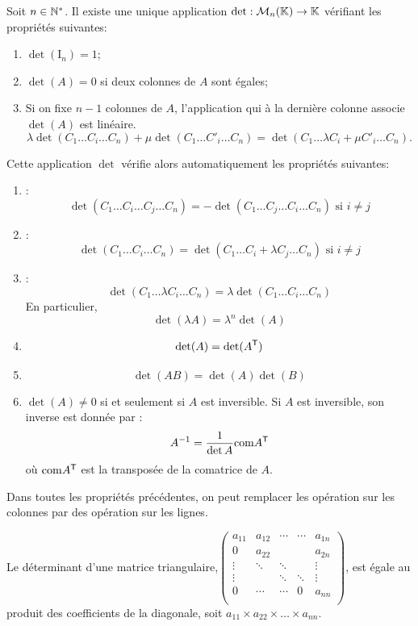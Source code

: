 \documentclass{book}
\begin{document}
\begin{Theoreme}
Soit $n\in  \mathbb{N}^*$.
Il existe une unique application $\mathop{\mathrm{det}}\nolimits: \mathcal{M}_{n}(\mathbb{K})\to\mathbb{K}$ vérifiant les propriétés suivantes:
\begin{enumerate}
\item $\det(\mathrm{I}_n) = 1$;
\item
  $\det(A) = 0$ si deux colonnes de $A$ sont égales;
\item
  Si on fixe $n-1$ colonnes de $A$, l'application qui à la dernière colonne associe $\det(A)$ est linéaire.
  $$\lambda \det(C_1 \dots C_i \dots C_n) + \mu  \det(C_1 \dots C'_i \dots C_n) = \det(C_1 \dots  \lambda C_i+ \mu C'_i  \dots C_n).$$
\end{enumerate}
\end{Theoreme}
\begin{Proposition}[Propriétés]
Cette application $\det$ vérifie alors automatiquement les propriétés suivantes:
\begin{enumerate}
\item {} : 
  $$\det(C_1 \dots C_i \dots C_j  \dots C_n) = -\det(C_1 \dots C_j \dots C_i  \dots C_n)\text{ si }i\neq j$$
\item {} :
  $$\det(C_1 \dots C_i  \dots C_n) =\det(C_1 \dots C_i+\lambda C_j  \dots C_n)\text{ si }i\neq j$$
\item {} :
  $$\det(C_1 \dots \lambda C_i  \dots C_n) =\lambda\det(C_1 \dots C_i  \dots C_n)$$
  En particulier,
  $$\det(\lambda A) =\lambda^n\det(A)$$
\item  {} $$\mathop{\mathrm{det}}\nolimits (A) = \mathop{\mathrm{det}}\nolimits (A^{\mathsf {T}})$$
\item  {} $$\det (AB) = \det (A)\det(B)$$
\item  {}  $\det(A) \neq 0$ si et seulement si $A$ est inversible. Si $A$ est inversible, son inverse est donnée par :
$$ A^{-1}=\frac {1}{\mathop{\mathrm{det}}\nolimits A} {\text{com}A^{\mathsf {T}}}$$
où $\text{com}A^{\mathsf {T}}$ est la transposée de la comatrice de $A$.
\end{enumerate}
Dans toutes les propriétés précédentes, on peut remplacer les opération sur les colonnes par des opération sur les lignes.
\end{Proposition}
\begin{Proposition} Le déterminant d'une matrice triangulaire,$\begin{pmatrix}a_{11}&a_{12}&\cdots &\cdots &a_{1n}\\0&a_{22}&&&a_{2n}\\\vdots &\ddots &\ddots &&\vdots \\\vdots &&\ddots &\ddots &\vdots \\0&\cdots &\cdots &0&a_{nn}\\\end{pmatrix}$,  est égale au produit des coefficients de la diagonale, soit $a_{11}\times a_{22} \times\dots\times a_{nn}$.
\end{Proposition}
\end{document}
